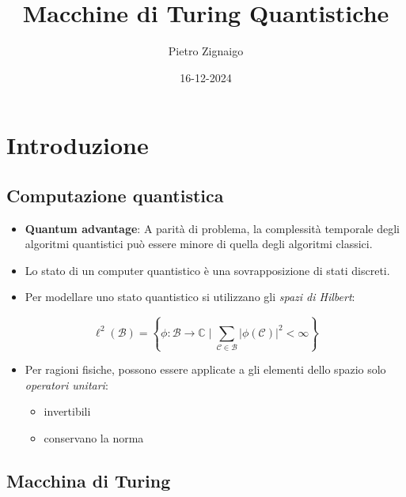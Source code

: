 \documentclass{beamer}
\title
{Macchine di Turing Quantistiche}
\author
{Pietro Zignaigo}
\institute
{Università di Genova}
\date
{16-12-2024}
\begin{document}
\begin{frame}
	\titlepage
\end{frame}

\begin{frame}
	\tableofcontents
\end{frame}

\section{Introduzione}

\subsection{Computazione quantistica}

\begin{frame}{\subsecname}
	\begin{itemize}
		\item \textbf{Quantum advantage}: A parità di problema, la complessità temporale degli algoritmi quantistici può essere minore di quella degli algoritmi classici.
		\item Lo stato di un computer quantistico è una sovrapposizione di stati discreti.
	\end{itemize}
\end{frame}

\begin{frame}{\subsecname}{}
	\begin{itemize}
		\item Per modellare uno stato quantistico si utilizzano gli \textit{spazi di Hilbert}:
	\end{itemize}
	\[ \ell^{2} \left ( \mathcal{B} \right ) = \left \{ \phi : \mathcal{B} \rightarrow \mathbb{C} \mid \sum_{\mathcal{C} \in \mathcal{B}} \left | \phi \left ( \mathcal{C} \right ) \right |^{2} < \infty \right \}\]
	\begin{itemize}
		\item Per ragioni fisiche, possono essere applicate a gli elementi dello spazio solo \textit{operatori unitari}:
		\begin{itemize}
			\item invertibili
			\item conservano la norma
		\end{itemize}
	\end{itemize}
\end{frame}

\subsection{Macchina di Turing}
\end{document}
